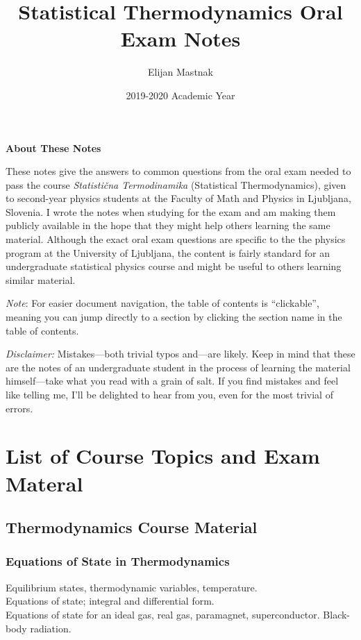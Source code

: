 \documentclass[11pt, a4paper]{article}
\begin{document}
	\vspace{-10mm}
	\title{Statistical Thermodynamics Oral Exam Notes}
	\author{Elijan Mastnak}
	\date{2019-2020 Academic Year}
	\maketitle

	\begin{center}
	\textbf{About These Notes}
	\end{center}
	These notes give the answers to common questions from the oral exam needed to pass the course \textit{Statisti\v{c}na Termodinamika} (Statistical Thermodynamics), given to second-year physics students at the Faculty of Math and Physics in Ljubljana, Slovenia. I wrote the notes when studying for the exam and am making them publicly available in the hope that they might help others learning the same material. Although the exact oral exam questions are specific to the the physics program at the University of Ljubljana, the content is fairly standard for an undergraduate statistical physics course and might be useful to others learning similar material.
	
	\vspace{2mm}
	\textit{Note}: For easier document navigation, the table of contents is ``clickable'', meaning you can jump directly to a section by clicking the section name in the table of contents.
	
	\vspace{2mm}
	\textit{Disclaimer:} Mistakes---both trivial typos and---are likely. Keep in mind that these are the notes of an undergraduate student in the process of learning the material himself---take what you read with a grain of salt. If you find mistakes and feel like telling me, I'll be delighted to hear from you, even for the most trivial of errors.
	
	

	\tableofcontents	
\iffalse


\section{List of Course Topics and Exam Materal}
\subsection{Thermodynamics Course Material}
\subsubsection{Equations of State in Thermodynamics}
Equilibrium states, thermodynamic variables, temperature.\\
Equations of state; integral and differential form.\\
Equations of state for an ideal gas, real gas, paramagnet, superconductor. Black-body radiation.
\end{document}
